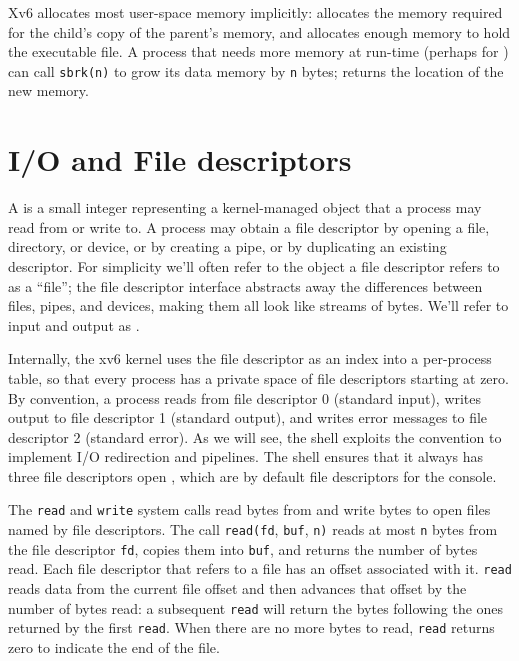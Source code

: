 Xv6 allocates most user-space memory
implicitly:
allocates the memory required for the child's copy of the
parent's memory, and
allocates enough memory to hold the executable file.
A process that needs more memory at run-time (perhaps for
)
can call
\lstinline{sbrk(n)}
to grow its data memory by
\lstinline{n}
bytes;
returns the location of the new memory.

\section{I/O and File descriptors}

A
is a small integer representing a kernel-managed object
that a process may read from or write to.
A process may obtain a file descriptor by opening a file, directory,
or device, or by creating a pipe, or by duplicating an existing
descriptor.
For simplicity we'll often refer to the object a file descriptor
refers to as a ``file'';
the file descriptor interface abstracts away the differences between
files, pipes, and devices, making them all look like streams of bytes.
We'll refer to input and output as .

Internally, the xv6 kernel uses the file descriptor
as an index into a per-process table,
so that every process has a private space of file descriptors
starting at zero.
By convention, a process reads from file descriptor 0 (standard input),
writes output to file descriptor 1 (standard output), and
writes error messages to file descriptor 2 (standard error).
As we will see, the shell exploits the convention to implement I/O redirection
and pipelines. The shell ensures that it always has three file descriptors
open
,
which are by default file descriptors for the console.

The
\lstinline{read}
and
\lstinline{write}
system calls read bytes from and write bytes to
open files named by file descriptors.
The call
\lstinline{read(fd},
\lstinline{buf},
\lstinline{n)}
reads at most
\lstinline{n}
bytes from the file descriptor
\lstinline{fd},
copies them into
\lstinline{buf},
and returns the number of bytes read.
Each file descriptor that refers to a file
has an offset associated with it.
\lstinline{read}
reads data from the current file offset and then advances
that offset by the number of bytes read:
a subsequent
\lstinline{read}
will return the bytes following the ones returned by the first
\lstinline{read}.
When there are no more bytes to read,
\lstinline{read}
returns zero to indicate the end of the file.

